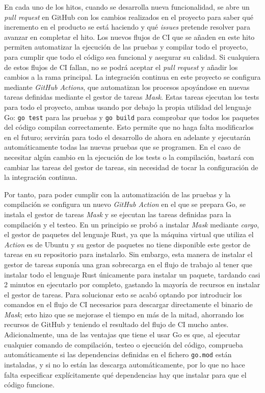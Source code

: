 En cada uno de los hitos, cuando se desarrolla nueva funcionalidad, se abre un
\textit{pull request} en GitHub con los cambios realizados en el proyecto para
saber qué incremento en el producto se está haciendo y qué \textit{issues}
pretende resolver para avanzar en completar el hito. Los nuevos flujos de CI que
se añaden en este hito permiten automatizar la ejecución de las pruebas y
compilar todo el proyecto, para cumplir que todo el código sea funcional y
asegurar su calidad. Si cualquiera de estos flujos de CI fallan, no se podrá
aceptar el \textit{pull request} y añadir los cambios a la rama principal. La
integración continua en este proyecto se configura mediante \textit{GitHub
Actions}, que automatizan los procesos apoyándose en nuevas tareas definidas
mediante el gestor de tareas \textit{Mask}. Estas tareas ejecutan los tests para
todo el proyecto, ambas usando por debajo la propia utilidad del lenguaje Go:
\texttt{go test} para las pruebas y \texttt{go build} para comprobar que todos
los paquetes del código compilan correctamente. Esto permite que no haga falta
modificarlos en el futuro; servirán para todo el desarrollo de ahora en adelante
y ejecutarán automáticamente todas las nuevas pruebas que se programen. En el
caso de necesitar algún cambio en la ejecución de los tests o la compilación,
bastará con cambiar las tareas del gestor de tareas, sin necesidad de tocar la
configuración de la integración continua.

Por tanto, para poder cumplir con la automatización de las pruebas y la
compilación se configura un nuevo \textit{GitHub Action} en el que se prepara
Go, se instala el gestor de tareas \textit{Mask} y se ejecutan las tareas
definidas para la compilación y el testeo. En un principio se probó a instalar
\textit{Mask} mediante \textit{cargo}, el gestor de paquetes del lenguaje Rust,
ya que la máquina virtual que utiliza el \textit{Action} es de Ubuntu y su
gestor de paquetes no tiene disponible este gestor de tareas en su repositorio
para instalarlo. Sin embargo, esta manera de instalar el gestor de tareas
suponía una gran sobrecarga en el flujo de trabajo al tener que instalar todo el
lenguaje Rust únicamente para instalar un paquete, tardando casi 2 minutos en
ejecutarlo por completo, gastando la mayoría de recursos en instalar el gestor
de tareas. Para solucionar esto se acabó optando por introducir los comandos en
el flujo de CI necesarios para descargar directamente el binario de
\textit{Mask}; esto hizo que se mejorase el tiempo en más de la mitad, ahorrando
los recursos de GitHub y teniendo el resultado del flujo de CI mucho antes.
Adicionalmente, una de las ventajas que tiene el usar Go es que, al ejecutar
cualquier comando de compilación, testeo o ejecución del código, comprueba
automáticamente si las dependencias definidas en el fichero \texttt{go.mod}
están instaladas, y si no lo están las descarga automáticamente, por lo que no
hace falta especificar explícitamente qué dependencias hay que instalar para que
el código funcione.

